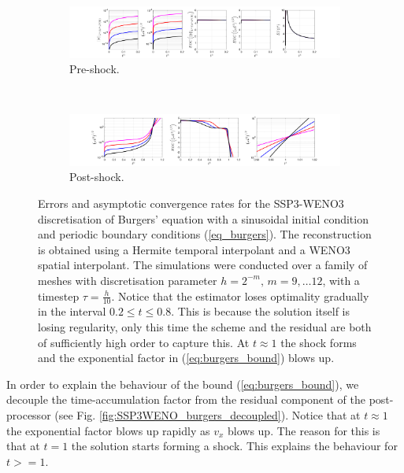 \documentclass[final]{amsart}
\numberwithin{equation}{section}
\begin{document}
\begin{figure}[H]
	\begin{subfigure}[b]{\textwidth}
		\includegraphics[width=\textwidth]{../figures/fig_SSP3WENO3_prehockplots_1x5_sin_IC_P3_burgers}	
		\caption{
			\label{fig:SSP3WENO3_burgers_P3_preshock}
			Pre-shock.
		}
	\end{subfigure}
	\\
	\begin{subfigure}[b]{\textwidth}
		\includegraphics[width=\textwidth]{../figures/fig_SSP3WENO3_postshockplots_1x5_sin_IC_P3_burgers}	
		\caption{\label{fig:SSP3WENO3_burgers_P3_postshock}
			Post-shock. 
		}
	\end{subfigure}
	\caption{\label{fig:SSP3WENO_burgers} Errors and asymptotic
          convergence rates for the SSP3-WENO3 discretisation of Burgers' equation with a
          sinusoidal initial condition and periodic boundary
          conditions (\ref{eq_burgers}).  The reconstruction is obtained using  a Hermite temporal interpolant and a WENO3 spatial interpolant.  The simulations were
          conducted over a family of meshes with discretisation
          parameter $h = 2^{-m}, \,m = 9,\dots 12$, with a timestep
          $\tau = \tfrac{h}{10}$.  Notice that  the estimator loses optimality gradually in the interval $0.2\leq t \leq 0.8$.  This is because the solution itself is losing regularity, only this time the scheme and the residual are both of sufficiently high order  to capture this.  At $t\approx 1$ the shock forms and the exponential factor in (\ref{eq:burgers_bound})  blows up.}
\end{figure}
In order to explain the behaviour of the bound (\ref{eq:burgers_bound}), we decouple  the time-accumulation factor from the residual component of the post-processor (see Fig. \ref{fig:SSP3WENO_burgers_decoupled}).  Notice that at $ t\approx1$ the exponential factor blows up rapidly as $v_x$ blows up.  The reason for this is that at $t=1$ the solution starts forming a shock.  This explains the behaviour for $t>=1$.  
\end{document}
